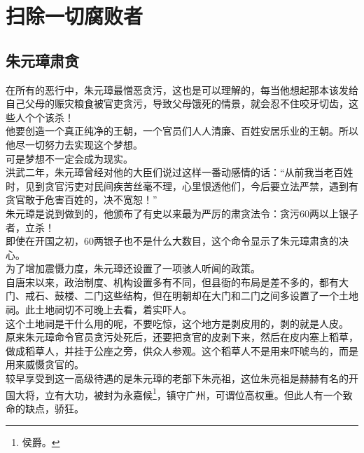 \section{扫除一切腐败者}
\ifnum{}
	\begin{multicols}{\theparacolNo}
\fi
\subsection{朱元璋肃贪}
在所有的恶行中，朱元璋最憎恶贪污，这也是可以理解的，每当他想起那本该发给自己父母的赈灾粮食被官吏贪污，导致父母饿死的情景，就会忍不住咬牙切齿，这些人个个该杀！\\

他要创造一个真正纯净的王朝，一个官员们人人清廉、百姓安居乐业的王朝。所以他尽一切努力去实现这个梦想。\\

可是梦想不一定会成为现实。\\

洪武二年，朱元璋曾经对他的大臣们说过这样一番动感情的话：“从前我当老百姓时，见到贪官污吏对民间疾苦丝毫不理，心里恨透他们，今后要立法严禁，遇到有贪官敢于危害百姓的，决不宽恕！”\\

朱元璋是说到做到的，他颁布了有史以来最为严厉的肃贪法令：贪污60两以上银子者，立杀！\\

即使在开国之初，60两银子也不是什么大数目，这个命令显示了朱元璋肃贪的决心。\\

为了增加震慑力度，朱元璋还设置了一项骇人听闻的政策。\\

自唐宋以来，政治制度、机构设置多有不同，但县衙的布局是差不多的，都有大门、戒石、鼓楼、二门这些结构，但在明朝却在大门和二门之间多设置了一个土地祠。此土地祠切不可晚上去看，着实吓人。\\

这个土地祠是干什么用的呢，不要吃惊，这个地方是剥皮用的，剥的就是人皮。\\

原来朱元璋命令官员贪污处死后，还要把贪官的皮剥下来，然后在皮内塞上稻草，做成稻草人，并挂于公座之旁，供众人参观。这个稻草人不是用来吓唬鸟的，而是用来威慑贪官的。\\

较早享受到这一高级待遇的是朱元璋的老部下朱亮祖，这位朱亮祖是赫赫有名的开国大将，立有大功，被封为永嘉候\footnote{侯爵。}，镇守广州，可谓位高权重。但此人有一个致命的缺点，骄狂。\\


\end{multicols}
